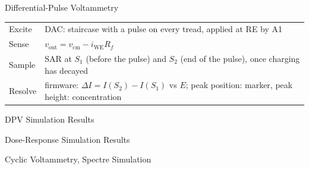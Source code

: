 \documentclass[10pt, aspectratio=169]{beamer}
\begin{document}
\begin{frame}{Differential-Pulse Voltammetry}
\centering
\resizebox{\linewidth}{!}{}
\vspace{0.1cm}

{\footnotesize
\begin{tabular}{@{}ll@{}}
Excite   & DAC: staircase with a pulse on every tread, applied at RE by A1 \\
Sense    & $v_{\mathrm{out}} = v_{\mathrm{cm}} - i_{\mathrm{WE}} R_f$ \\
Sample   & SAR at $S_1$ (before the pulse) and $S_2$ (end of the pulse), once charging has decayed \\
Resolve  & firmware: $\Delta I = I(S_2) - I(S_1)$ vs $E$; peak position: marker, peak height: concentration \\
\end{tabular}}
\end{frame}

\begin{frame}{DPV Simulation Results}
\centering{}
\vspace{0.05cm}
\end{frame}

\begin{frame}{Dose-Response Simulation Results}
\centering{}
\vspace{0.05cm}
\end{frame}

\begin{frame}{Cyclic Voltammetry, Spectre Simulation}
\centering{}
\vspace{0.05cm}
\end{frame}
\end{document}
